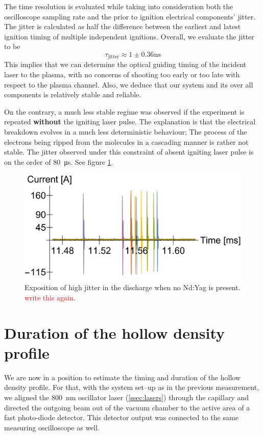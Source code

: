 \documentclass[justified,nofonts,nobib,openany]{tufte-book}
\begin{document}
The time resolution is evaluated while taking into consideration both the oscilloscope sampling rate and the prior to ignition electrical components' jitter. The jitter is calculated as half the difference between the earliest and latest ignition timing of multiple independent ignitions. Overall, we evaluate the jitter to be
\begin{equation}
	\tau_\text{jitter}\approx 1\pm 0.36\si{\ns}
\end{equation}
This implies that we can determine the optical guiding timing of the incident laser to the plasma, with no concerns of shooting too early or too late with respect to the plasma channel. Also, we deduce that our system and its over all components is relatively stable and reliable.

On the contrary, a much less stable regime was observed if the experiment is repeated \textbf{without} the igniting laser pulse. The explanation is that the electrical breakdown evolves in a much less deterministic behaviour; The process of the electrons being ripped from the molecules in a cascading manner is rather not stable. The jitter observed under this constraint of absent igniting laser pulse is on the order of \SI{80}{\us}. See figure \ref{fig:multiple}.
\begin{figure}
    \centering
    \includegraphics[width=\textwidth]{figures/jitter/multiple.pdf}
    \caption{Exposition of high jitter in the discharge when no Nd:Yag is present. \textcolor{red}{write this again.}}
    \label{fig:multiple}
\end{figure}

\section{Duration of the hollow density profile}\label{sec:duration-of-guiding}
We are now in a position to estimate the timing and duration of the hollow density profile. For that, with the system set--up as in the previous measurement, we aligned the \SI{800}{\nm} oscillator laser (\ref{ssec:lasers}) through the capillary and directed the outgoing beam out of the vacuum chamber to the active area of a fast photo-diode detector. This detector output was connected to the same measuring oscilloscope as well.
\end{document}
